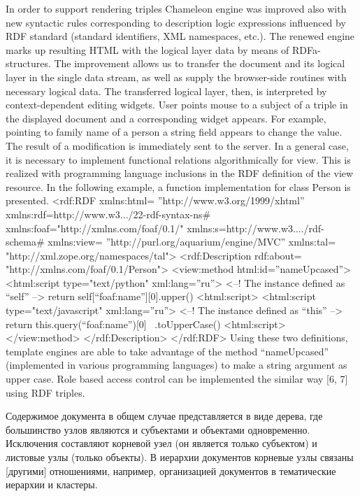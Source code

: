 \documentclass[utf8]{../IncArticle}
\newcommand{\e}[2][fcolor]{\textcolor{pcolor}{[}\textcolor{#1}{#2}\textcolor{pcolor}{]}}
\begin{document}
In order to support rendering triples Chameleon engine was improved also with new syntactic rules corresponding to description logic expressions influenced by RDF standard (standard identifiers, XML namespaces, etc.). The renewed engine marks up resulting HTML with the logical layer data by means of RDFa-structures. The improvement allows us to transfer the document and its logical layer in the single data stream, as well as supply the browser-side routines with necessary logical data. The transferred logical layer, then, is interpreted by context-dependent editing widgets. User points mouse to a subject of a triple in the displayed document and a corresponding widget appears. For example, pointing to family name of a person a string field appears to change the value. The result of a modification is immediately sent to the server.
In a general case, it is necessary to implement functional relations algorithmically for view. This is realized with programming language inclusions in the RDF definition of the view resource. In the following example, a function implementation for class Person is presented.
<rdf:RDF xmlns:html=
 ”http://www.w3.org/1999/xhtml”
  xmlns:rdf=http://www.w3.../22-rdf-syntax-ns#
  xmlns:foaf="http://xmlns.com/foaf/0.1/"
  xmlns:s=http://www.w3..../rdf-schema#
  xmlns:view=
   ”http://purl.org/aquarium/engine/MVC”
  xmlns:tal=
   "http://xml.zope.org/namespaces/tal">
  <rdf:Description rdf:about=
   "http://xmlns.com/foaf/0.1/Person">
    <view:method html:id=”nameUpcased”>
       <html:script
        type="text/python" xml:lang=”ru”>
  <--! The instance defined as “self” -->
   return self[“foaf:name”][0].upper()
 <html:script>
 <html:script
   type="text/javascript" xml:lang=”ru”>
  <--! The instance defined as “this” -->
   return this.query(“foaf:name”)[0] \
      .toUpperCase()
 <html:script>
    </view:method>
  </rdf:Description>
</rdf:RDF>
Using these two definitions, template engines are able to take advantage of the method “nameUpcased” (implemented in various programming languages) to make a string argument as upper case. Role based access control can be implemented the similar way [6, 7] using RDF triples.

Содержимое документа в общем случае представляется в виде дерева, где
большинство узлов являются и субъектами и объектами
одновременно. Исключения составляют корневой узел (он является только
субъектом) и листовые узлы (только объекты).  В иерархии документов
корневые узлы связаны \e{другими} отношениями, например, организацией
документов в тематические иерархии и кластеры.
\end{document}
